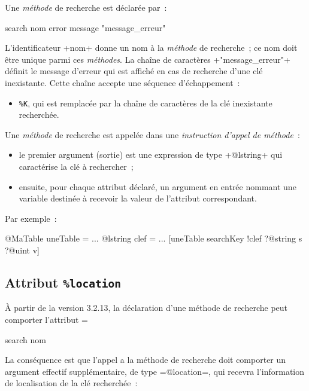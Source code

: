 Une \emph{méthode} de recherche est déclarée par~:


\begin{galgas}
search nom error message "message_erreur"
\end{galgas}

L'identificateur \ggs+nom+ donne un nom à la \emph{méthode} de recherche~; ce nom doit être unique parmi ces \emph{méthodes}. La chaîne de caractères \ggs+"message_erreur"+ définit le message d'erreur qui est affiché en cas de recherche d'une clé inexistante. Cette chaîne accepte une séquence d'échappement~:
\begin{itemize}
  \item \texttt{\%K}, qui est remplacée par la chaîne de caractères de la clé inexistante recherchée.
\end{itemize}


Une \emph{méthode} de recherche est appelée dans une \emph{instruction d'appel de méthode}~:
\begin{itemize}
  \item le premier argument (sortie) est une expression de type \ggs+@lstring+ qui caractérise la clé à rechercher~;
  \item ensuite, pour chaque attribut déclaré, un argument en entrée nommant une variable destinée à recevoir la valeur de l'attribut correspondant.
\end{itemize}

Par exemple~:
\begin{galgas}
@MaTable uneTable = {}
...
@lstring clef = ...
[uneTable searchKey !clef ?@string s ?@uint v]
\end{galgas}


\subsection{Attribut \texttt{\%location}}

À partir de la version 3.2.13, la déclaration d'une méthode de recherche peut comporter l'attribut \ggs=%

\begin{galgas}
search nom %
\end{galgas}

La conséquence est que l'appel a la méthode de recherche doit comporter un argument effectif supplémentaire, de type \ggs=@location=, qui recevra l'information de localisation de la clé recherchée~:

